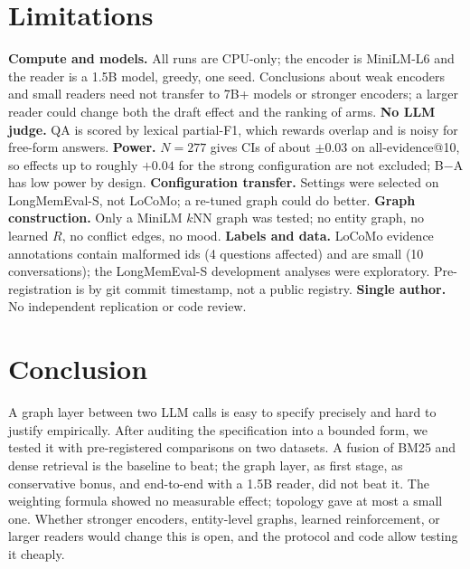 \documentclass[10pt]{article}
\begin{document}
\section{Limitations}
\textbf{Compute and models.} All runs are CPU-only; the encoder is MiniLM-L6 and the reader is a 1.5B model, greedy, one seed. Conclusions about weak encoders and small readers need not transfer to 7B+ models or stronger encoders; a larger reader could change both the draft effect and the ranking of arms. \textbf{No LLM judge.} QA is scored by lexical partial-F1, which rewards overlap and is noisy for free-form answers. \textbf{Power.} $N=277$ gives CIs of about $\pm0.03$ on all-evidence@10, so effects up to roughly $+0.04$ for the strong configuration are not excluded; B$-$A has low power by design. \textbf{Configuration transfer.} Settings were selected on LongMemEval-S, not LoCoMo; a re-tuned graph could do better. \textbf{Graph construction.} Only a MiniLM $k$NN graph was tested; no entity graph, no learned $R$, no conflict edges, no mood. \textbf{Labels and data.} LoCoMo evidence annotations contain malformed ids (4 questions affected) and are small (10 conversations); the LongMemEval-S development analyses were exploratory. Pre-registration is by git commit timestamp, not a public registry. \textbf{Single author.} No independent replication or code review.

\section{Conclusion}
A graph layer between two LLM calls is easy to specify precisely and hard to justify empirically. After auditing the specification into a bounded form, we tested it with pre-registered comparisons on two datasets. A fusion of BM25 and dense retrieval is the baseline to beat; the graph layer, as first stage, as conservative bonus, and end-to-end with a 1.5B reader, did not beat it. The weighting formula showed no measurable effect; topology gave at most a small one. Whether stronger encoders, entity-level graphs, learned reinforcement, or larger readers would change this is open, and the protocol and code allow testing it cheaply.
\end{document}
